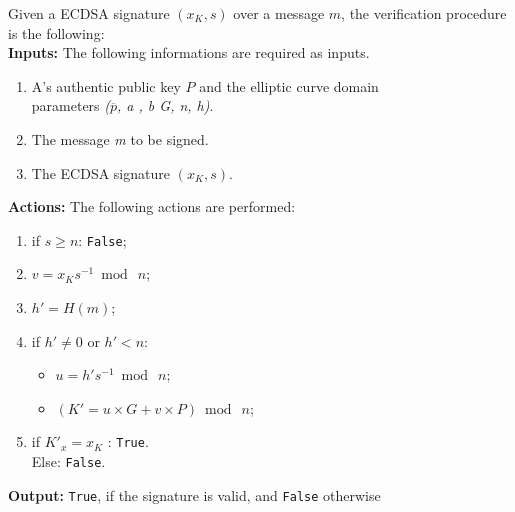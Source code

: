 Given a ECDSA signature $(x_{K},s)$ over a message $m$, the verification procedure is the following: \\
\textbf{Inputs:} The following informations are required as inputs. 

\hspace{1.1cm}
\begin{minipage}[l]{2\linewidth}
	\begin{enumerate}
		\item A's authentic public key  \textit{$P$} and the elliptic curve domain \\parameters \textit{($\overline{p}$, a , b G, n, h)}.
		\item The message \textit{m} to be signed.
		\item The ECDSA signature $(x_{K},s)$.\\
	\end{enumerate}
\end{minipage}
\textbf{Actions:} The following actions are performed:

\hspace{1.1cm}
\begin{minipage}[l]{2\linewidth}
	\begin{enumerate}
		\item if $s\geq n$: \texttt{False};
		\item $v=x_{K}s^{-1} \bmod\ n$;
		\item $h'= H(m)$;
		\item if $h'\neq 0$ or $h'<n$:
		\begin{itemize}
			\item $u=h' s^{-1} \bmod\ n$;
			\item $(K'=u\times G + v\times P) \bmod\ n$;
		\end{itemize}
		\item if $K'_{x} = x_{K}$ : \texttt{True}.\\
		Else: \texttt{False}.\\
	\end{enumerate}
\end{minipage}
\textbf{Output:} \texttt{True}, if the signature is valid, and \texttt{False} otherwise


